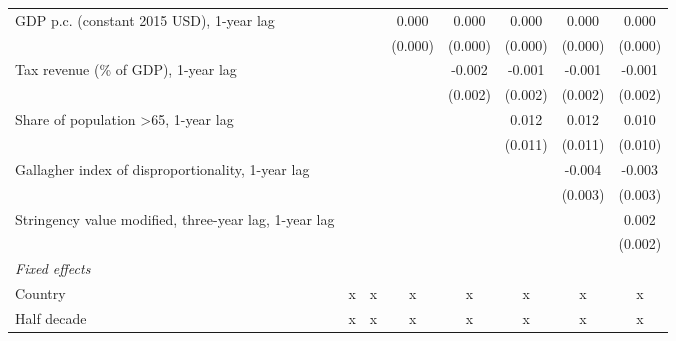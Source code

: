 \begin{table}[htbp]
\begin{tabular}{lccccccc}
      GDP p.c. (constant 2015 USD), 1-year lag                            &               &               & 0.000         & 0.000         & 0.000         & 0.000         & 0.000\\   
                                                                          &               &               & (0.000)       & (0.000)       & (0.000)       & (0.000)       & (0.000)\\   
      Tax revenue (\% of GDP), 1-year lag                                 &               &               &               & -0.002        & -0.001        & -0.001        & -0.001\\   
                                                                          &               &               &               & (0.002)       & (0.002)       & (0.002)       & (0.002)\\   
      Share of population >65, 1-year lag                                 &               &               &               &               & 0.012         & 0.012         & 0.010\\   
                                                                          &               &               &               &               & (0.011)       & (0.011)       & (0.010)\\   
      Gallagher index of disproportionality, 1-year lag                   &               &               &               &               &               & -0.004        & -0.003\\   
                                                                          &               &               &               &               &               & (0.003)       & (0.003)\\   
      Stringency value modified, three-year lag, 1-year lag               &               &               &               &               &               &               & 0.002\\   
                                                                          &               &               &               &               &               &               & (0.002)\\   
      \emph{Fixed effects}\\
      Country                                                             & x             & x             & x             & x             & x             & x             & x\\  
      Half decade                                                         & x             & x             & x             & x             & x             & x             & x\\  

\end{tabular}
\end{table}

